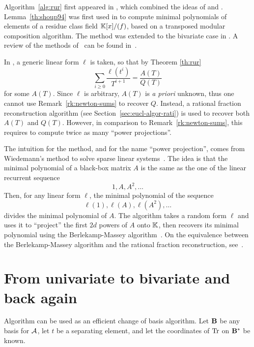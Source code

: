 \begin{remark}
  \label{rk:shoups-algorithm-1}
  Algorithm~\ref{alg:rur} first appeared in
  \cite{bostan+salvy+schost03}, which combined the ideas of
  \cite{rouiller99} and
  \cite{shoup94,shoup95,shoup99}. Lemma~\ref{th:shoup94} was first
  used in \cite{shoup94} to compute minimal polynomials of elements of
  a residue class field $\mathbb{K}[x]/(f)$, based on a transposed modular
  composition algorithm. The method was extended to the bivariate case
  in \cite{shoup99}. A review of the methods
  of~\cite{shoup94,shoup95,shoup99} can be found
  in~\cite[$\S$6]{Ka2K}.
  
  In \cite{shoup94,shoup99}, a generic linear form $\ell$ is taken, so
  that by Theorem \ref{th:rur}
  \[\sum_{i\ge0}\frac{\ell(t^i)}{T^{i+1}}=\frac{A(T)}{Q(T)}\]
  for some $A(T)$. Since $\ell$ is arbitrary, $A(T)$ is \emph{a
    priori} unknown, thus one cannot use Remark~\ref{rk:newton-sums}
  to recover $Q$. Instead, a rational fraction reconstruction
  algorithm (see Section~\ref{sec:eucl-algor-rati}) is used to recover
  both $A(T)$ and $Q(T)$. However, in comparison to
  Remark~\ref{rk:newton-sums}, this requires to compute twice as many
  ``power projections''.
  
  The intuition for the method, and for the name ``power projection'',
  comes from Wiedemann's method to solve sparse linear
  systems~\cite{wiedemann:sparse}. The idea is that the minimal
  polynomial of a black-box matrix $A$ is the same as the one of the
  linear recurrent sequence
  \[1,A,A^2,\ldots\] 
  Then, for any linear form $\ell$, the minimal polynomial of the sequence
  \[\ell(1),\ell(A),\ell(A^2),\ldots\]
  divides the minimal polynomial of $A$. The algorithm takes a random
  form $\ell$ and uses it to ``project'' the first $2d$ powers of $A$
  onto $\mathbb{K}$, then recovers its minimal polynomial using the
  Berlekamp-Massey algorithm~\cite{massey69}. On the equivalence
  between the Berlekamp-Massey algorithm and the rational fraction
  reconstruction, see~\cite{dornstetter87}.
\end{remark}


\section{From univariate to bivariate and back again}
\label{sec:from-univ-bivar}

Algorithm  can be used as an efficient change of basis
algorithm. Let $\mathbf{B}$ be any basis for $\mathcal{A}$, let $t$ be a
separating element, and let the coordinates of $\operatorname{Tr}$ on
$\mathbf{B}^\ast$ be known.

